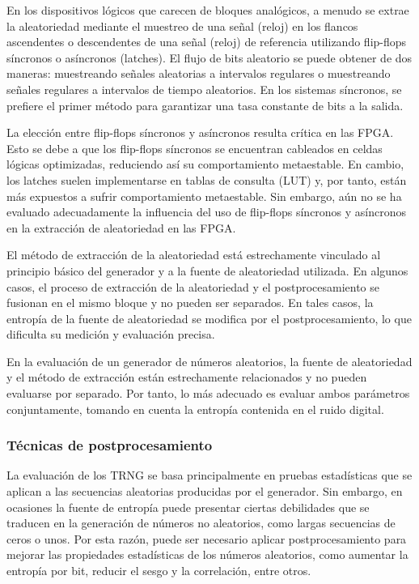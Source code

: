            En los dispositivos lógicos que carecen de bloques analógicos, a menudo se extrae la aleatoriedad mediante el muestreo de una señal (reloj) en los flancos ascendentes o descendentes de una señal (reloj) de referencia utilizando flip-flops síncronos o asíncronos (latches). El flujo de bits aleatorio se puede obtener de dos maneras: muestreando señales aleatorias a intervalos regulares o muestreando señales regulares a intervalos de tiempo aleatorios. En los sistemas síncronos, se prefiere el primer método para garantizar una tasa constante de bits a la salida.

            La elección entre flip-flops síncronos y asíncronos resulta crítica en las FPGA. Esto se debe a que los flip-flops síncronos se encuentran cableados en celdas lógicas optimizadas, reduciendo así su comportamiento metaestable. En cambio, los latches suelen implementarse en tablas de consulta (LUT) y, por tanto, están más expuestos a sufrir comportamiento metaestable. Sin embargo, aún no se ha evaluado adecuadamente la influencia del uso de flip-flops síncronos y asíncronos en la extracción de aleatoriedad en las FPGA.
                
            El método de extracción de la aleatoriedad está estrechamente vinculado al principio básico del generador y a la fuente de aleatoriedad utilizada. En algunos casos, el proceso de extracción de la aleatoriedad y el postprocesamiento se fusionan en el mismo bloque y no pueden ser separados. En tales casos, la entropía de la fuente de aleatoriedad se modifica por el postprocesamiento, lo que dificulta su medición y evaluación precisa.
                
            En la evaluación de un generador de números aleatorios, la fuente de aleatoriedad y el método de extracción están estrechamente relacionados y no pueden evaluarse por separado. Por tanto, lo más adecuado es evaluar ambos parámetros conjuntamente, tomando en cuenta la entropía contenida en el ruido digital.
    
            \subsubsection{Técnicas de postprocesamiento}
                
            La evaluación de los TRNG se basa principalmente en pruebas estadísticas que se aplican a las secuencias aleatorias producidas por el generador. Sin embargo, en ocasiones la fuente de entropía puede presentar ciertas debilidades que se traducen en la generación de números no aleatorios, como largas secuencias de ceros o unos. Por esta razón, puede ser necesario aplicar postprocesamiento para mejorar las propiedades estadísticas de los números aleatorios, como aumentar la entropía por bit, reducir el sesgo y la correlación, entre otros.
                
